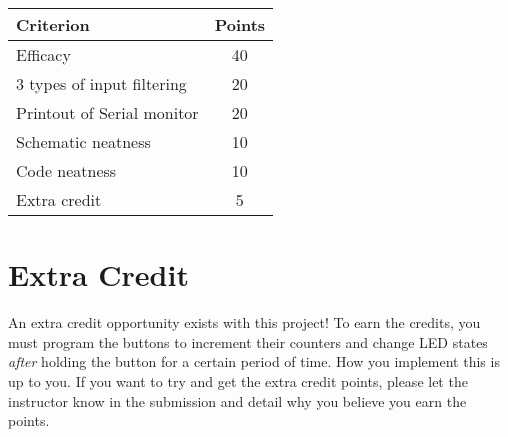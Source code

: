 \begin{table*}[ht!]
    \begin{tabular}{ l | c }
        \toprule
        Criterion & Points \\

        \midrule
        Efficacy & 40 \\
        3 types of input filtering & 20 \\
        Printout of Serial monitor & 20 \\
        Schematic neatness & 10 \\
        Code neatness & 10 \\
        Extra credit & 5 \\

        \bottomrule
    \end{tabular}
\end{table*}

\section*{Extra Credit}
An extra credit opportunity exists with this project! 
To earn the credits, you must program the buttons to increment their counters and change LED states \emph{after} holding the button for a certain period of time.
How you implement this is up to you.
If you want to try and get the extra credit points, please let the instructor know in the submission and detail why you believe you earn the points.
